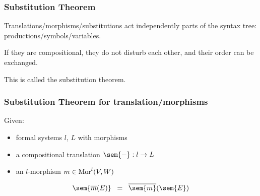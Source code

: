 \begin{frame}\frametitle{Substitution Theorem}
Translations/morphisms/substitutions act independently parts of the syntax tree: productions/symbols/variables.\\
\bigskip

If they are compositional, they do not disturb each other, and their order can be exchanged.\\
\bigskip

This is called the substitution theorem.
\end{frame}


\begin{frame}\frametitle{Substitution Theorem for translation/morphisms}
Given:
\begin{itemize}
\item formal systems $l$, $L$ with morphisms
\item a compositional translation $\sem{-}:l\to L$
\item an $l$-morphism $m\in\mathrm{Mor}^l(V,W)$
\end{itemize}

\[\sem{\ov{m}(E)}\;\; = \;\; \ov{\sem{m}}(\sem{E})\]

\begin{center}
\end{center}
\end{frame}

